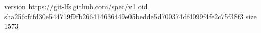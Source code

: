 version https://git-lfs.github.com/spec/v1
oid sha256:fcfd30e544719f9fb266414636449e05bedde5d700374df4099f4fe2c75f38f3
size 1573
